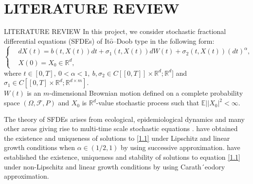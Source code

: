 \documentclass[unknownkeysallowed, compress]{beamer}
\theoremstyle{plain}
\begin{document}

\section{LITERATURE REVIEW}
\begin{frame}[allowframebreaks]{LITERATURE REVIEW}
In this project, we consider stochastic fractional differential equations (SFDEs) of
It$\hat{\mbox{o}}$–Doob type in the following form:
\begin{equation}\label{1.1}
\left\{
\begin{split}
&dX(t) = b(t,X(t))dt+\sigma_1(t,X(t))dW(t)+\sigma_2(t,X(t))(dt)^\alpha,\\
&X(0) = X_0\in\mathbb{R}^d,
\end{split}
\right.
\end{equation}
where $t\in[0,T],~0<\alpha<1,~b,\sigma_2\in C[[0,T]]\times \mathbb{R}^d;\mathbb{R}^d]$ and $\sigma_1\in C[[0,T]\times \mathbb{R}^d;\mathbb{R}^{d\times m}]$.\\
$W(t)$ is an $m$-dimensional Brownian motion defined on a complete probability space $(\Omega,\mathcal{F},P)$ and $X_0$ is $\mathbb{R}^d$-value stochastic process such that $\mathbb{E}||X_0|^2<\infty.$\\

\par The theory of SFDEs arises from ecological, epidemiological dynamics and many
other areas giving rise to multi-time scale stochastic equations \cite{12}. \cite{12} have obtained the existence and uniqueness of solutions to \eqref{1.1}
under Lipschitz and linear growth conditions when $\alpha\in(1/2,1)$  by using successive
approximation. \cite{1} have established the existence, uniqueness and
stability of solutions to equation \eqref{1.1} under \cite{26} non-Lipschitz and linear
growth conditions by using Carath´eodory approximation.\\


\end{frame}
\end{document}
